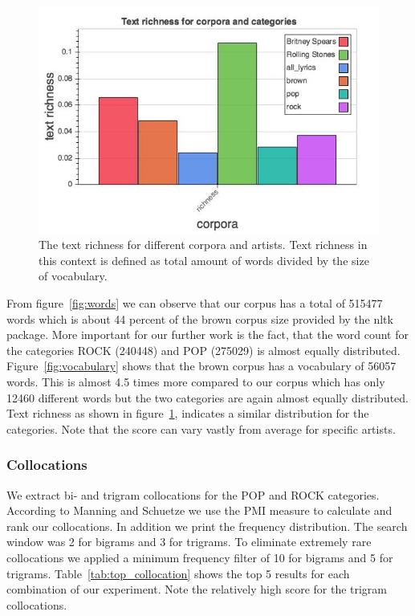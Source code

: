 \documentclass[a4paper,12pt]{article}
\begin{document}
\begin{figure}
\centering
\includegraphics[width=0.5\linewidth]{richness}
\caption{The text richness for different corpora and artists. Text richness in this context is defined as total amount of words divided by the size of vocabulary.}
\label{fig:richness}
\end{figure}


From figure~\ref{fig:words} we can observe that our corpus has a total of 515477 words which is about 44 percent of the brown corpus size provided by the nltk package. More important for our further work is the fact, that the word count for the categories ROCK (240448) and POP (275029) is almost equally distributed. Figure~\ref{fig:vocabulary} shows that the brown corpus has a vocabulary of 56057 words. This is almost 4.5 times more compared to our corpus which has only 12460 different words but the two categories are again almost equally distributed.
Text richness as shown in figure~\ref{fig:richness}, indicates a similar distribution for the categories. Note that the score can vary vastly from average for specific artists.

\subsubsection{Collocations}
We extract bi- and trigram collocations for the POP and ROCK categories. According to Manning and Schuetze \cite{manning1999foundations} we use the PMI measure to calculate and rank our collocations. In addition we print the frequency distribution. The search window was 2 for bigrams and 3 for trigrams. To eliminate extremely rare collocations we applied a minimum frequency filter of 10 for bigrams and 5 for trigrams. Table~\ref{tab:top_collocation} shows the top 5 results for each combination of our experiment. Note the relatively high score for the trigram collocations. 
\end{document}
